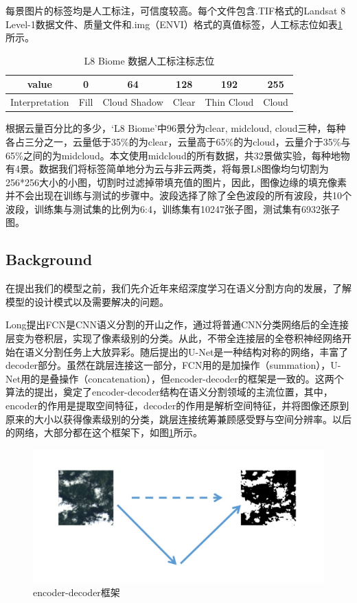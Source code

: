 \documentclass[UTF8]{ctexart}
\begin{document}
每景图片的标签均是人工标注，可信度较高。每个文件包含.TIF格式的Landsat 8 Level-1数据文件、质量文件和.img（ENVI）格式的真值标签，人工标志位如表\ref{BiomeFlag}所示。

\begin{table}[H]
    \centering
    \begin{tabular}{c|ccccc}
    \hline
    \hline
    value& 0& 64& 128& 192& 255\\
    \hline
    Interpretation&	Fill& Cloud Shadow& Clear &Thin Cloud& Cloud\\
    \hline
    \hline
    \end{tabular}
    \caption{L8 Biome 数据人工标注标志位}
    \label{BiomeFlag}
    \end{table}

根据云量百分比的多少，‘L8 Biome’中96景分为clear, midcloud, cloud三种，每种各占三分之一，云量低于35\%的为clear，云量高于65\%的为cloud，云量介于35\%与65\%之间的为midcloud。本文使用midcloud的所有数据，共32景做实验，每种地物有4景。数据我们将标签简单地分为云与非云两类，将每景L8图像均匀切割为256*256大小的小图，切割时过滤掉带填充值的图片，因此，图像边缘的填充像素并不会出现在训练与测试的步骤中。波段选择了除了全色波段的所有波段，共10个波段，训练集与测试集的比例为6:4，训练集有10247张子图，测试集有6932张子图。

\subsection{Background}

在提出我们的模型之前，我们先介近年来绍深度学习在语义分割方向的发展，了解模型的设计模式以及需要解决的问题。

Long提出FCN\cite{FCN}是CNN语义分割的开山之作，通过将普通CNN分类网络后的全连接层变为卷积层，实现了像素级别的分类。从此，不带全连接层的全卷积神经网络开始在语义分割任务上大放异彩。随后提出的U-Net\cite{ronneberger2015unet}是一种结构对称的网络，丰富了decoder部分。虽然在跳层连接这一部分，FCN用的是加操作（summation），U-Net用的是叠操作（concatenation），但encoder-decoder的框架是一致的。这两个算法的提出，奠定了encoder-decoder结构在语义分割领域的主流位置，其中，encoder的作用是提取空间特征，decoder的作用是解析空间特征，并将图像还原到原来的大小以获得像素级别的分类，跳层连接统筹兼顾感受野与空间分辨率。以后的网络，大部分都在这个框架下，如图\ref{fig:en-decoder}所示。

\begin{figure}[H]
    \centering
    \includegraphics[scale=0.3]{../pic/en-decoder.jpg}
    \caption{encoder-decoder框架}
    \label{fig:en-decoder}
\end{figure}
\end{document}
